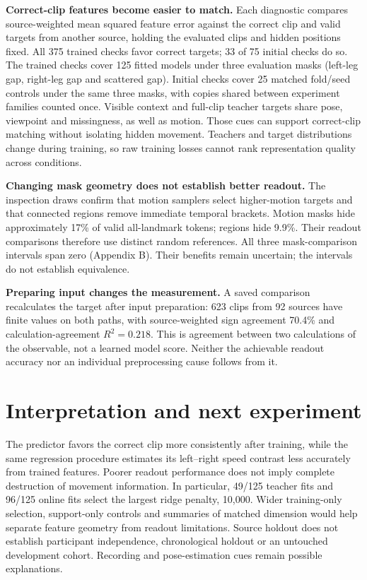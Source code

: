 \documentclass{article}
\begin{document}
\textbf{Correct-clip features become easier to match.} Each diagnostic
compares source-weighted mean squared feature error against the correct
clip and valid targets from another source, holding the evaluated clips
and hidden positions fixed. All 375 trained checks favor correct
targets; 33 of 75 initial checks do so. The trained checks cover 125
fitted models under three evaluation masks (left-leg gap, right-leg gap
and scattered gap). Initial checks cover 25 matched fold/seed controls
under the same three masks, with copies shared between experiment
families counted once. Visible context and full-clip teacher targets
share pose, viewpoint and missingness, as well as motion. Those cues can
support correct-clip matching without isolating hidden movement.
Teachers and target distributions change during training, so raw
training losses cannot rank representation quality across conditions.

\textbf{Changing mask geometry does not establish better readout.} The
inspection draws confirm that motion samplers select higher-motion
targets and that connected regions remove immediate temporal brackets.
Motion masks hide approximately 17\% of valid all-landmark tokens;
regions hide 9.9\%. Their readout comparisons therefore use distinct
random references. All three mask-comparison intervals span zero
(Appendix B). Their benefits remain uncertain; the intervals do not
establish equivalence.

\textbf{Preparing input changes the measurement.} A saved comparison
recalculates the target after input preparation: 623 clips from 92
sources have finite values on both paths, with source-weighted sign
agreement 70.4\% and calculation-agreement \(R^2=0.218\). This is
agreement between two calculations of the observable, not a learned
model score. Neither the achievable readout accuracy nor an individual
preprocessing cause follows from it.

\section{Interpretation and next
experiment}\label{interpretation-and-next-experiment}

The predictor favors the correct clip more consistently after training,
while the same regression procedure estimates its left--right speed
contrast less accurately from trained features. Poorer readout
performance does not imply complete destruction of movement information.
In particular, 49/125 teacher fits and 96/125 online fits select the
largest ridge penalty, 10,000. Wider training-only selection,
support-only controls and summaries of matched dimension would help
separate feature geometry from readout limitations. Source holdout does
not establish participant independence, chronological holdout or an
untouched development cohort. Recording and pose-estimation cues remain
possible explanations.
\end{document}
